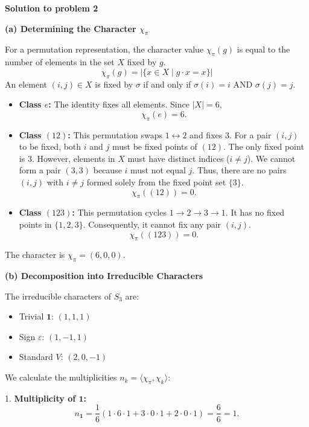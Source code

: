\documentclass{article}
\begin{document}
\hrulefill

\textbf{Solution to problem 2}

\textbf{(a) Determining the Character $\chi_\pi$}

For a permutation representation, the character value $\chi_\pi(g)$ is equal to the number of elements in the set $X$ fixed by $g$.
\[ \chi_\pi(g) = |\{ x \in X \mid g \cdot x = x \}| \]
An element $(i, j) \in X$ is fixed by $\sigma$ if and only if $\sigma(i) = i$ AND $\sigma(j) = j$.

\begin{itemize}
    \item \textbf{Class $e$:} The identity fixes all elements. Since $|X| = 6$,
    \[ \chi_\pi(e) = 6. \]
    
    \item \textbf{Class $(12)$:} This permutation swaps $1 \leftrightarrow 2$ and fixes $3$.
    For a pair $(i, j)$ to be fixed, both $i$ and $j$ must be fixed points of $(12)$. The only fixed point is $3$.
    However, elements in $X$ must have distinct indices ($i \neq j$). We cannot form a pair $(3, 3)$ because $i$ must not equal $j$.
    Thus, there are no pairs $(i, j)$ with $i \neq j$ formed solely from the fixed point set $\{3\}$.
    \[ \chi_\pi((12)) = 0. \]
    
    \item \textbf{Class $(123)$:} This permutation cycles $1 \to 2 \to 3 \to 1$. It has no fixed points in $\{1, 2, 3\}$.
    Consequently, it cannot fix any pair $(i, j)$.
    \[ \chi_\pi((123)) = 0. \]
\end{itemize}

The character is $\chi_\pi = (6, 0, 0)$.

\vspace{1em}
\textbf{(b) Decomposition into Irreducible Characters}

The irreducible characters of $S_3$ are:
\begin{itemize}
    \item Trivial $\mathbf{1}$: $(1, 1, 1)$
    \item Sign $\varepsilon$: $(1, -1, 1)$
    \item Standard $V$: $(2, 0, -1)$
\end{itemize}

We calculate the multiplicities $n_k = \langle \chi_\pi, \chi_k \rangle$:

1. \textbf{Multiplicity of $\mathbf{1}$:}
\[ n_{\mathbf{1}} = \frac{1}{6} (1 \cdot 6 \cdot 1 + 3 \cdot 0 \cdot 1 + 2 \cdot 0 \cdot 1) = \frac{6}{6} = 1. \]
\end{document}
